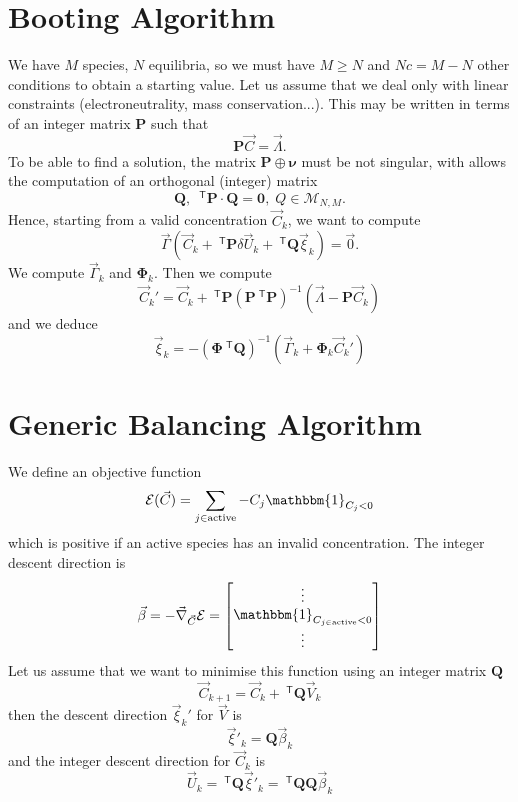 \documentclass[aps]{revtex4}
\newcommand{\mymat}[1]{\bm{#1}}
\newcommand{\mytrn}[1]{~^{\mathsf{T}}{#1}}
\begin{document}
\section{Booting Algorithm}
We have $M$ species, $N$ equilibria, 
so we must have $M\geq N$ and $Nc=M-N$ other conditions
to obtain a starting value.
Let us assume that we deal only with linear constraints (electroneutrality, mass conservation...).
This may be written in terms of an integer matrix $\mymat{P}$
such that
$$
	\mymat{P}\vec{C} = \vec{\Lambda}.
$$
To be able to find a solution, the matrix $\mymat{P}\oplus\mymat{\nu}$ must
be not singular, with allows the computation of an orthogonal (integer) matrix
$$
	\mymat{Q},\;\mytrn{\mymat{P}}\cdot\mymat{Q} = \mymat{0},\;Q\in\mathcal{M}_{N,M}.
$$
Hence, starting from a valid concentration $\vec{C}_k$, we want to compute
$$
	\vec{\Gamma}
	\left(
		\vec{C}_k+\mytrn{\mymat{P}}\delta\vec{U}_k + \mytrn{\mymat{Q}}\vec{\xi}_k
		\right) = \vec{0}.
$$
We compute $\vec{\Gamma}_k$ and $\mymat{\Phi}_k$. Then we
compute
$$
	\vec{C}_k' = \vec{C}_k + \mytrn{\mymat{P}}\left(\mymat{P}\mytrn{\mymat{P}}\right)^{-1}\left(\vec{\Lambda}-\mymat{P}\vec{C}_k\right)
$$
and we deduce
$$
	\vec{\xi}_k = -\left(\mymat{\Phi}\mytrn{\mymat{Q}}\right)^{-1}\left(\vec{\Gamma}_k+\mymat{\Phi}_k \vec{C}_k'\right)
$$

\section{Generic Balancing Algorithm}
We define an objective function
$$
	\mathcal{E}(\vec{C}) = \sum_{j\in\mathrm{active}} -C_j \mathbbm{1}_{C_j<0}
$$
which is positive if an active species has an invalid concentration.
The integer descent direction is
$$
	\vec{\beta} = - \vec{\nabla}_{\vec{C}} \mathcal{E} = 
	\begin{bmatrix}
		\vdots\\
		\mathbbm{1}_{C_{j\in\mathrm{active}}<0}\\
		\vdots
	\end{bmatrix}
$$
Let us assume that we want to minimise this function using an integer matrix $\mymat{Q}$
$$
	\vec{C}_{k+1} = \vec{C}_k + \mytrn{\mymat{Q}}\vec{V}_k
$$
then the descent direction $\vec{\xi}_k'$ for $\vec{V}$ is
$$
		\vec{\xi}'_k = \mymat{Q} \vec{\beta}_k
$$
and the integer descent direction for $\vec{C}_k$ is
$$
	\vec{U}_k = \mytrn{\mymat{Q}} \vec{\xi}'_k = \mytrn{\mymat{Q}} \mymat{Q} \vec{\beta}_k
$$
\end{document}
